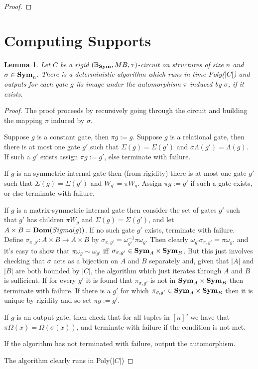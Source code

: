 \documentclass[12pt]{report}
\newtheorem{lem}[thm]{Lemma} \newtheorem{prop}[thm]{Proposition}
\newcommand{\SB}{\mathbb{B}_{\sym}} %
\newcommand{\sym}{\text{\textbf{Sym}}}
\newcommand{\dom}{\text{\textbf{Dom}}}
\begin{document}
  \begin{proof}
  
  \end{proof}

  \section{Computing Supports}
  
 \begin{lem}
   Let $C$ be a rigid $(\SB, MB, \tau)$-circuit on structures of size $n$ and
   $\sigma \in \sym_n$. There is a deterministic algorithm which runs in time
   Poly($\vert C \vert$) and outputs for each gate $g$ its image under the
   automorphism $\pi$ induced by $\sigma$, if it exists.
 \end{lem}
 \begin{proof}
   The proof proceeds by recursively going through the circuit and building the
   mapping $\pi$ induced by $\sigma$.

   Suppose $g$ is a constant gate, then $\pi g := g$. Suppose $g$ is a
   relational gate, then there is at most one gate $g'$ such that $\Sigma (g) =
   \Sigma (g')$ and $\sigma\Lambda (g') = \Lambda (g)$. If such a $g'$ exists
   assign $\pi g := g'$, else terminate with failure.

   If $g$ is an symmetric internal gate then (from rigidity) there is at most
   one gate $g'$ such that $\Sigma (g) = \Sigma(g')$ and $W_{g'} = \pi W_g$.
   Assign $\pi g := g'$ if such a gate exists, or else terminate with failure.

   If $g$ is a matrix-symmetric internal gate then consider the set of gates
   $g'$ such that $g'$ has children $\pi W_g$ and $\Sigma(g) = \Sigma(g')$, and
   let $A \times B = \dom (Sigma(g))$. If no such gate $g'$ exists, terminate
   with failure. Define $\sigma_{\pi, g'}:A \times B \rightarrow A \times B$ by
   $\sigma_{\pi, g'} = \omega^{-1}_{g'} \pi \omega_{g}$. Then clearly
   $\omega_{g'} \sigma_{\pi, g'} = \pi \omega_{g}$, and it's easy to show that
   $\pi \omega_g \sim \omega_{g'}$ iff $\sigma_{\pi,g'} \in \sym_A \times
   \sym_B$. But this just involves checking that $\sigma$ acts as a bijection on
   $A$ and $B$ separately and, given that $\vert A \vert$ and $\vert B \vert$
   are both bounded by $\vert C \vert$, the algorithm which just iterates
   through $A$ and $B$ is sufficient. If for every $g'$ it is found that
   $\pi_{\sigma,g'}$ is not in $\sym_A \times \sym_B$ then terminate with
   failure. If there is a $g'$ for which $\pi_{\sigma, g'} \in \sym_A \times
   \sym_B$ then it is unique by rigidity and so set $\pi g := g'$.

   If $g$ is an output gate, then check that for all tuples in $[n]^{q}$ we have
   that $\pi \Omega (x) = \Omega (\sigma (x))$, and terminate with failure if
   the condition is not met.

   If the algorithm has not terminated with failure, output the automorphism.

   The algorithm clearly runs in Poly($\vert C \vert$)
 \end{proof}
\end{document}
